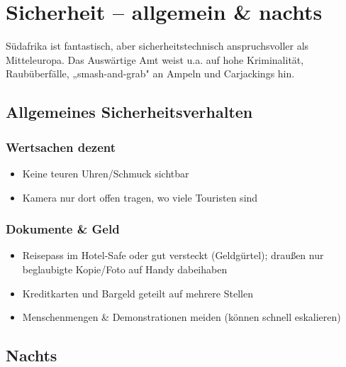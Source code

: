 \documentclass[12pt,a4paper]{article}
\begin{document}
\section{Sicherheit – allgemein \& nachts}

\begin{warnbox}
\faExclamationTriangle \hspace{0.2cm} Südafrika ist fantastisch, aber sicherheitstechnisch anspruchsvoller als Mitteleuropa. Das Auswärtige Amt weist u.a. auf hohe Kriminalität, Raubüberfälle, „smash-and-grab" an Ampeln und Carjackings hin.\cite{auswaertiges-amt-1}
\end{warnbox}

\subsection{Allgemeines Sicherheitsverhalten}

\subsubsection{Wertsachen dezent}

\begin{itemize}[leftmargin=*,label={\color{warningred}\faEyeSlash}]
    \item Keine teuren Uhren/Schmuck sichtbar
    \item Kamera nur dort offen tragen, wo viele Touristen sind
\end{itemize}

\subsubsection{Dokumente \& Geld}

\begin{itemize}[leftmargin=*,label={\color{mainblue}\faLock}]
    \item Reisepass im Hotel-Safe oder gut versteckt (Geldgürtel); draußen nur beglaubigte Kopie/Foto auf Handy dabeihaben\cite{southafrica-diplo-1}
    \item Kreditkarten und Bargeld geteilt auf mehrere Stellen
    \item Menschenmengen \& Demonstrationen meiden (können schnell eskalieren)
\end{itemize}

\newpage
\subsection{Nachts}
\end{document}
